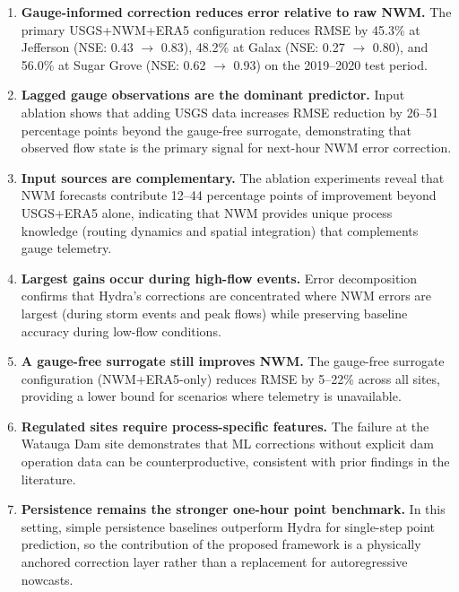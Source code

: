 \documentclass[draft]{agujournal2019}
\begin{document}
\begin{enumerate}
    \item \textbf{Gauge-informed correction reduces error relative to raw NWM.} The primary USGS+NWM+ERA5 configuration reduces RMSE by 45.3\% at Jefferson (NSE: 0.43 $\to$ 0.83), 48.2\% at Galax (NSE: 0.27 $\to$ 0.80), and 56.0\% at Sugar Grove (NSE: 0.62 $\to$ 0.93) on the 2019--2020 test period.

    \item \textbf{Lagged gauge observations are the dominant predictor.} Input ablation shows that adding USGS data increases RMSE reduction by 26--51 percentage points beyond the gauge-free surrogate, demonstrating that observed flow state is the primary signal for next-hour NWM error correction.

    \item \textbf{Input sources are complementary.} The ablation experiments reveal that NWM forecasts contribute 12--44 percentage points of improvement beyond USGS+ERA5 alone, indicating that NWM provides unique process knowledge (routing dynamics and spatial integration) that complements gauge telemetry.

    \item \textbf{Largest gains occur during high-flow events.} Error decomposition confirms that Hydra's corrections are concentrated where NWM errors are largest (during storm events and peak flows) while preserving baseline accuracy during low-flow conditions.

    \item \textbf{A gauge-free surrogate still improves NWM.} The gauge-free surrogate configuration (NWM+ERA5-only) reduces RMSE by 5--22\% across all sites, providing a lower bound for scenarios where telemetry is unavailable.

    \item \textbf{Regulated sites require process-specific features.} The failure at the Watauga Dam site demonstrates that ML corrections without explicit dam operation data can be counterproductive, consistent with prior findings in the literature.

    \item \textbf{Persistence remains the stronger one-hour point benchmark.} In this setting, simple persistence baselines outperform Hydra for single-step point prediction, so the contribution of the proposed framework is a physically anchored correction layer rather than a replacement for autoregressive nowcasts.
\end{enumerate}
\end{document}
